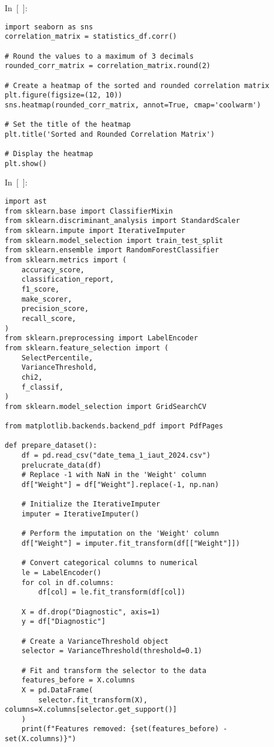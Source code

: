\documentclass[
  english,
]{article}
\begin{document}
In~{[}~{]}:

\begin{verbatim}
import seaborn as sns
correlation_matrix = statistics_df.corr()

# Round the values to a maximum of 3 decimals
rounded_corr_matrix = correlation_matrix.round(2)

# Create a heatmap of the sorted and rounded correlation matrix
plt.figure(figsize=(12, 10))
sns.heatmap(rounded_corr_matrix, annot=True, cmap='coolwarm')

# Set the title of the heatmap
plt.title('Sorted and Rounded Correlation Matrix')

# Display the heatmap
plt.show()
\end{verbatim}

In~{[}~{]}:

\begin{verbatim}
import ast
from sklearn.base import ClassifierMixin
from sklearn.discriminant_analysis import StandardScaler
from sklearn.impute import IterativeImputer
from sklearn.model_selection import train_test_split
from sklearn.ensemble import RandomForestClassifier
from sklearn.metrics import (
    accuracy_score,
    classification_report,
    f1_score,
    make_scorer,
    precision_score,
    recall_score,
)
from sklearn.preprocessing import LabelEncoder
from sklearn.feature_selection import (
    SelectPercentile,
    VarianceThreshold,
    chi2,
    f_classif,
)
from sklearn.model_selection import GridSearchCV

from matplotlib.backends.backend_pdf import PdfPages

def prepare_dataset():
    df = pd.read_csv("date_tema_1_iaut_2024.csv")
    prelucrate_data(df)
    # Replace -1 with NaN in the 'Weight' column
    df["Weight"] = df["Weight"].replace(-1, np.nan)

    # Initialize the IterativeImputer
    imputer = IterativeImputer()

    # Perform the imputation on the 'Weight' column
    df["Weight"] = imputer.fit_transform(df[["Weight"]])

    # Convert categorical columns to numerical
    le = LabelEncoder()
    for col in df.columns:
        df[col] = le.fit_transform(df[col])

    X = df.drop("Diagnostic", axis=1)
    y = df["Diagnostic"]

    # Create a VarianceThreshold object
    selector = VarianceThreshold(threshold=0.1)

    # Fit and transform the selector to the data
    features_before = X.columns
    X = pd.DataFrame(
        selector.fit_transform(X), columns=X.columns[selector.get_support()]
    )
    print(f"Features removed: {set(features_before) - set(X.columns)}")


\end{verbatim}
\end{document}
